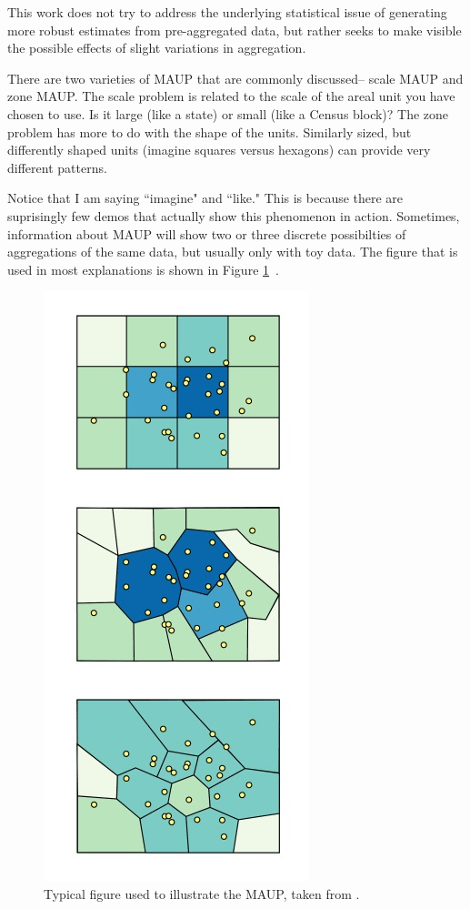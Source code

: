 \documentclass{article}\usepackage[]{graphicx}\usepackage[]{color}
\begin{document}
This work does not try to address the underlying statistical issue of generating more robust estimates from pre-aggregated data, but rather seeks to make visible the possible effects of slight variations in aggregation. 

There are two varieties of MAUP that are commonly discussed-- scale MAUP and zone MAUP. The scale problem is related to the scale of the areal unit you have chosen to use. Is it large (like a state) or small (like a Census block)? The zone problem has more to do with the shape of the units. Similarly sized, but differently shaped units (imagine squares versus hexagons) can provide very different patterns. 

Notice that I am saying ``imagine" and ``like." This is because there are suprisingly few demos that actually show this phenomenon in action. Sometimes, information about MAUP will show two or three discrete possibilties of aggregations of the same data, but usually only with toy data. The figure that is used in most explanations is shown in Figure \ref{MAUP}~\citep{Pen2014, Erv2015}. 

\begin{figure}[htbp]
\begin{centering}
\includegraphics[height=0.5\textheight]{img/MAUPZone1}
\caption{Typical figure used to illustrate the MAUP, taken from \cite{Erv2015}.}\label{MAUP}
\end{centering}
\end{figure}
\end{document}
